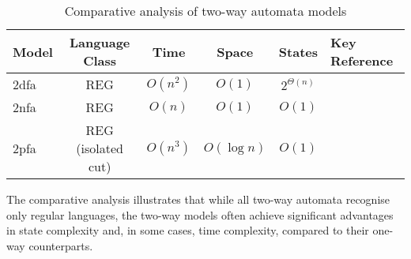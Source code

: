 
\begin{table}[ht]
    \label{tab:two-way-comparison}
    \centering
    \begin{tabular}{|l|c|c|c|c|l|}
        \hline
        \textbf{Model} & \textbf{Language Class} & \textbf{Time} & \textbf{Space} & \textbf{States} & \textbf{Key Reference} \\ 
        \hline
        \gls{2dfa}  & REG & \(O(n^2)\) & \(O(1)\) & \(2^{\Theta(n)}\) & \cite{shepherdson1959reduction} \\
        \gls{2nfa}  & REG & \(O(n)\) & \(O(1)\) & \(O(1)\) & \cite{sakoda1978nfas} \\
        \gls{2pfa}  & REG (isolated cut) & \(O(n^3)\) & \(O(\log n)\) & \(O(1)\) & \cite{dwork1990time} \\
        \hline
    \end{tabular}
    \caption{Comparative analysis of two-way automata models}
\end{table}

\begin{remark}
The comparative analysis illustrates that while all two-way automata recognise only regular languages, the two-way models often achieve significant advantages in state complexity and, in some cases, time complexity, compared to their one-way counterparts.
\end{remark} 

